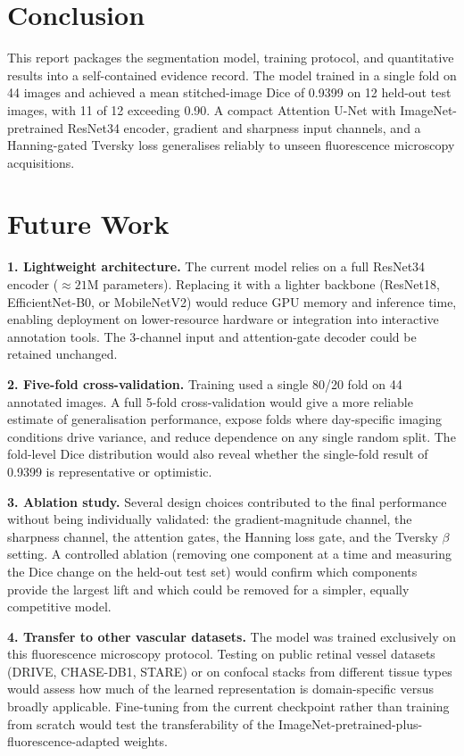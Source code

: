 \documentclass[11pt,letterpaper]{article}
\begin{document}
\section{Conclusion}
This report packages the segmentation model, training protocol, and quantitative results into a self-contained evidence record. The model trained in a single fold on 44 images and achieved a mean stitched-image Dice of 0.9399 on 12 held-out test images, with 11 of 12 exceeding 0.90. A compact Attention U-Net with ImageNet-pretrained ResNet34 encoder, gradient and sharpness input channels, and a Hanning-gated Tversky loss generalises reliably to unseen fluorescence microscopy acquisitions.

\section{Future Work}

\textbf{1. Lightweight architecture.}
The current model relies on a full ResNet34 encoder (${\approx}21\text{M}$ parameters). Replacing it with a lighter backbone (ResNet18, EfficientNet-B0, or MobileNetV2) would reduce GPU memory and inference time, enabling deployment on lower-resource hardware or integration into interactive annotation tools. The 3-channel input and attention-gate decoder could be retained unchanged.

\textbf{2. Five-fold cross-validation.}
Training used a single 80/20 fold on 44 annotated images. A full 5-fold cross-validation would give a more reliable estimate of generalisation performance, expose folds where day-specific imaging conditions drive variance, and reduce dependence on any single random split. The fold-level Dice distribution would also reveal whether the single-fold result of 0.9399 is representative or optimistic.

\textbf{3. Ablation study.}
Several design choices contributed to the final performance without being individually validated: the gradient-magnitude channel, the sharpness channel, the attention gates, the Hanning loss gate, and the Tversky $\beta$ setting. A controlled ablation (removing one component at a time and measuring the Dice change on the held-out test set) would confirm which components provide the largest lift and which could be removed for a simpler, equally competitive model.

\textbf{4. Transfer to other vascular datasets.}
The model was trained exclusively on this fluorescence microscopy protocol. Testing on public retinal vessel datasets (DRIVE, CHASE-DB1, STARE) or on confocal stacks from different tissue types would assess how much of the learned representation is domain-specific versus broadly applicable. Fine-tuning from the current checkpoint rather than training from scratch would test the transferability of the ImageNet-pretrained-plus-fluorescence-adapted weights.
\end{document}
